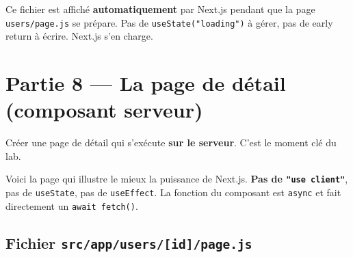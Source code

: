 \documentclass[11pt,a4paper]{article}
\begin{document}
Ce fichier est affiché \textbf{automatiquement} par Next.js pendant que la page \texttt{users/page.js} se prépare. Pas de \texttt{useState("loading")} à gérer, pas de early return à écrire. Next.js s'en charge.

\section{Partie 8 --- La page de détail (composant serveur)}

\begin{objectifbox}
Créer une page de détail qui s'exécute \textbf{sur le serveur}. C'est le moment clé du lab.
\end{objectifbox}

Voici la page qui illustre le mieux la puissance de Next.js. \textbf{Pas de \texttt{"use client"}}, pas de \texttt{useState}, pas de \texttt{useEffect}. La fonction du composant est \texttt{async} et fait directement un \texttt{await fetch()}.

\subsection{Fichier \texttt{src/app/users/[id]/page.js}}
\end{document}
